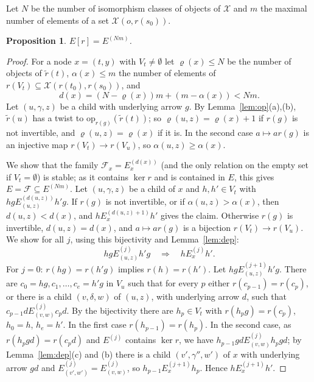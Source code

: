 \documentclass[11pt]{amsart}
\newtheorem{prop}[thm]{Proposition}
\theoremstyle{definition}
\newcommand{\cX}{\mathcal X}
\newcommand{\opn}{\mathrm{op}}
\begin{document}
Let $N$ be the number of isomorphism classes of objects of $\cX$ and
$m$ the maximal number of elements of a set $\cX(o,r(s_0))$.

\begin{prop}\label{prop:depth}
$E[r]=E^{(Nm)}$.
\end{prop}
\begin{proof}
For a node $x=(t,y)$ with $V_t\ne\emptyset$ let $\varrho(x)\le N$ be
the number of objects of $\tilde r(t)$, $\alpha(x)\le m$ the number
of elements of $r(V_t)\subseteq\cX(r(t_0),r(s_0))$, and
\[
d(x)=(N-\varrho(x))m+(m-\alpha(x))<Nm .
\]
Let $(u,\gamma,z)$ be a child with underlying arrow $g$. By
Lemma~\ref{lem:op}(a),(b), $\tilde r(u)$ has a twist to
$\opn_{r(g)}(\tilde r(t))$; so $\varrho(u,z)=\varrho(x)+1$ if $r(g)$
is not invertible, and $\varrho(u,z)=\varrho(x)$ if it is. In the
second case $a\mapsto ar(g)$ is an injective map $r(V_t)\to r(V_u)$,
so $\alpha(u,z)\ge\alpha(x)$.

We show that the family $\mathcal F_x=E^{(d(x))}_x$ (and the only
relation on the empty set if $V_t=\emptyset$) is stable; as it
contains $\ker r$ and is contained in $E$, this gives $E=\mathcal
F\subseteq E^{(Nm)}$. Let $(u,\gamma,z)$ be a child of $x$ and $h,h'
\in V_t$ with $hg\mathrel{E^{(d(u,z))}_{(u,z)}}h'g$. If $r(g)$ is not
invertible, or if $\alpha(u,z)>\alpha(x)$, then $d(u,z)<d(x)$, and
$h\mathrel{E^{(d(u,z)+1)}_x}h'$ gives the claim. Otherwise $r(g)$ is
invertible, $d(u,z)=d(x)$, and $a\mapsto ar(g)$ is a bijection
$r(V_t)\to r(V_u)$. We show for all $j$, using this bijectivity and Lemma~\ref{lem:dep}:
\begin{equation}\label{eq:hoist}
hg\mathrel{E^{(j)}_{(u,z)}}h'g\quad\Longrightarrow\quad
h\mathrel{E^{(j)}_x}h'.
\end{equation}
For $j=0$: $r(hg)=r(h'g)$ implies $r(h)=r(h')$. Let
$hg\mathrel{E^{(j+1)}_{(u,z)}}h'g$. There are $c_0=hg,c_1,\dots,
c_e=h'g$ in $V_u$ such that for every $p$ either $r(c_{p-1})=r(c_p)$,
or there is a child $(v,\delta,w)$ of $(u,z)$, with underlying arrow
$d$, such that $c_{p-1}d\mathrel{E^{(j)}_{(v,w)}}c_pd$. By the
bijectivity there are $h_p\in V_t$ with $r(h_pg)=r(c_p)$, $h_0=h$,
$h_e=h'$. In the first case $r(h_{p-1})=r(h_p)$. In the second case,
as $r(h_pgd)=r(c_pd)$ and $E^{(j)}$ contains $\ker r$, we have
$h_{p-1}gd\mathrel{E^{(j)}_{(v,w)}}h_pgd$; by
Lemma~\ref{lem:dep}(c) and (b) there is a child $(v',\gamma'',w')$ of
$x$ with underlying arrow $gd$ and $E^{(j)}_{(v',w')}=E^{(j)}_{(v,
w)}$, so $h_{p-1}\mathrel{E^{(j+1)}_x}h_p$. Hence
$h\mathrel{E^{(j+1)}_x}h'$.
\end{proof}
\end{document}
